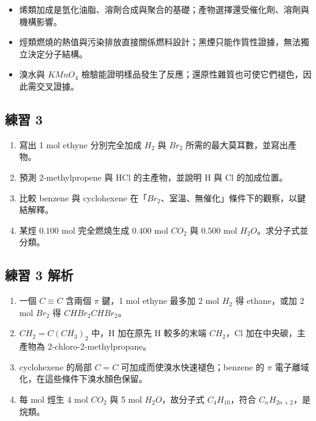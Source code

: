 \documentclass[11pt,a4paper]{article}
\providecommand{\tightlist}{%
  \setlength{\itemsep}{0pt}\setlength{\parskip}{0pt}}
\begin{document}
\begin{itemize}
\tightlist
\item
  烯類加成是氫化油脂、溶劑合成與聚合的基礎；產物選擇還受催化劑、溶劑與機構影響。
\item
  烴類燃燒的熱值與污染排放直接關係燃料設計；黑煙只能作質性證據，無法獨立決定分子結構。
\item
  溴水與 \(KMnO_4\) 檢驗能證明樣品發生了反應；還原性雜質也可使它們褪色，因此需交叉證據。
\end{itemize}

\subsection{練習 3}\label{ux7df4ux7fd2-3}

\begin{enumerate}
\def\labelenumi{\arabic{enumi}.}
\tightlist
\item
  寫出 1 mol ethyne 分別完全加成 \(H_2\) 與 \(Br_2\) 所需的最大莫耳數，並寫出產物。
\item
  預測 2-methylpropene 與 HCl 的主產物，並說明 H 與 Cl 的加成位置。
\item
  比較 benzene 與 cyclohexene 在「\(Br_2\)、室溫、無催化」條件下的觀察，以鍵結解釋。
\item
  某烴 \(0.100\) mol 完全燃燒生成 \(0.400\) mol \(CO_2\) 與 \(0.500\) mol \(H_2O\)。求分子式並分類。
\end{enumerate}

\subsection{練習 3 解析}\label{ux7df4ux7fd2-3-ux89e3ux6790}

\begin{enumerate}
\def\labelenumi{\arabic{enumi}.}
\tightlist
\item
  一個 \(C\equiv C\) 含兩個 \(\pi\) 鍵，1 mol ethyne 最多加 2 mol \(H_2\) 得 ethane，或加 2 mol \(Br_2\) 得 \(CHBr_2CHBr_2\)。
\item
  \(CH_2=C(CH_3)_2\) 中，H 加在原先 H 較多的末端 \(CH_2\)，Cl 加在中央碳，主產物為 2-chloro-2-methylpropane。
\item
  cyclohexene 的局部 \(C=C\) 可加成而使溴水快速褪色；benzene 的 \(\pi\) 電子離域化，在這些條件下溴水顏色保留。
\item
  每 mol 烴生 4 mol \(CO_2\) 與 5 mol \(H_2O\)，故分子式 \(C_4H_{10}\)，符合 \(C_nH_{2n+2}\)，是烷類。
\end{enumerate}
\end{document}
